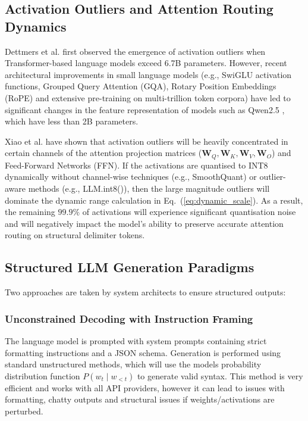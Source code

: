 \documentclass[10pt,journal,compsoc]{IEEEtran}
\begin{document}
\subsection{Activation Outliers and Attention Routing Dynamics}
Dettmers et al. \cite{dettmers2022llmint8} first observed the emergence of activation outliers when Transformer-based language models exceed 6.7B parameters. However, recent architectural improvements in small language models (e.g., SwiGLU activation functions, Grouped Query Attention (GQA), Rotary Position Embeddings (RoPE) and extensive pre-training on multi-trillion token corpora) have led to significant changes in the feature representation of models such as Qwen2.5 \cite{qwen2024qwen25}, which have less than 2B parameters.

Xiao et al. \cite{xiao2023smoothquant} have shown that activation outliers will be heavily concentrated in certain channels of the attention projection matrices ($\mathbf{W}_Q, \mathbf{W}_K, \mathbf{W}_V, \mathbf{W}_O$) and Feed-Forward Networks (FFN). If the activations are quantised to INT8 dynamically without channel-wise techniques (e.g., SmoothQuant) or outlier-aware methods (e.g., LLM.int8()), then the large magnitude outliers will dominate the dynamic range calculation in Eq.~(\ref{eq:dynamic_scale}). As a result, the remaining $99.9\%$ of activations will experience significant quantisation noise and will negatively impact the model's ability to preserve accurate attention routing on structural delimiter tokens.

\subsection{Structured LLM Generation Paradigms}

Two approaches are taken by system architects to ensure structured outputs:

\subsubsection{Unconstrained Decoding with Instruction Framing}

The language model is prompted with system prompts containing strict formatting instructions and a JSON schema. Generation is performed using standard unstructured methods, which will use the models probability distribution function $P(w_t \mid w_{<t})$ to generate valid syntax. This method is very efficient and works with all API providers, however it can lead to issues with formatting, chatty outputs and structural issues if weights/activations are perturbed.
\end{document}

